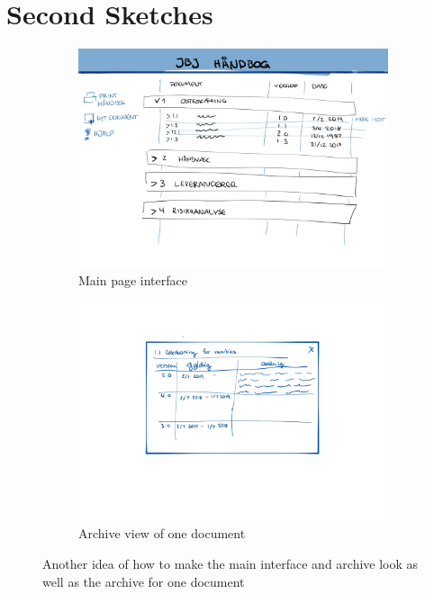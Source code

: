 \section{Second Sketches}\label{sec:Second-sketches}
\begin{figure}[H]
	\centering
	\begin{subfigure}[b]{0.48\textwidth}
		\includegraphics[width=\textwidth]{billeder/Main-view2.jpg}
		\caption{Main page interface}
		\label{fig:2-Main}
	\end{subfigure}
	\quad
	\begin{subfigure}[b]{0.48\textwidth}
		\includegraphics[width=\textwidth]{billeder/Archive-view2.jpg}
		\caption{Archive view of one document}
		\label{fig:2-Archive}
	\end{subfigure}
	\caption{Another idea of how to make the main interface and archive look as well as the archive for one document}
\end{figure}

